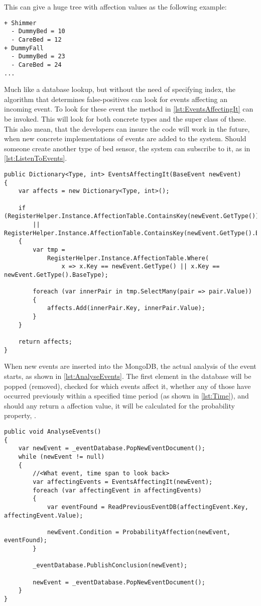 This can give a huge tree with affection values as the following example:
\vspace{-15pt}
\begin{verbatim}
+ Shimmer
  - DummyBed = 10
  - CareBed = 12
+ DummyFall
  - DummyBed = 23
  - CareBed = 24
...
\end{verbatim}
\vspace{-10pt}
Much like a database lookup, but without the need of specifying index, the algorithm that determines false-positives can look for events affecting an incoming event.
To look for these event the method in \codeTitle \ref{lst:EventsAffectingIt} can be invoked.
This will look for both concrete types and the super class of these.
This also mean, that the developers can insure the code will work in the future, when new concrete implementations of events are added to the system.
Should someone create another type of bed sensor, the system can subscribe to it, as in \codeTitle \ref{lst:ListenToEvents}.

\begin{lstlisting}[caption=Find affection based on input event, style=Code-C++, label=lst:EventsAffectingIt]
public Dictionary<Type, int> EventsAffectingIt(BaseEvent newEvent)
{
	var affects = new Dictionary<Type, int>();

	if (RegisterHelper.Instance.AffectionTable.ContainsKey(newEvent.GetType())
		|| RegisterHelper.Instance.AffectionTable.ContainsKey(newEvent.GetType().BaseType))
	{
		var tmp =
			RegisterHelper.Instance.AffectionTable.Where(
				x => x.Key == newEvent.GetType() || x.Key == newEvent.GetType().BaseType);

		foreach (var innerPair in tmp.SelectMany(pair => pair.Value))
		{
			affects.Add(innerPair.Key, innerPair.Value);
		}
	}

	return affects;
}
\end{lstlisting}

When new events are inserted into the MongoDB, the actual analysis of the event starts, as shown in \codeTitle \ref{lst:AnalyseEvents}.
The first element in the database will be popped (removed), checked for which events affect it, whether any of those have occurred previously within a specified time period (as shown in \codeTitle \ref{lst:Time}), and should any return a affection value, it will be calculated for the probability property, .

\begin{lstlisting}[caption=Analyzing an event, style=Code-C++, label=lst:AnalyseEvents]
public void AnalyseEvents()
{
	var newEvent = _eventDatabase.PopNewEventDocument();
	while (newEvent != null)
	{
		//<What event, time span to look back>
		var affectingEvents = EventsAffectingIt(newEvent);
		foreach (var affectingEvent in affectingEvents)
		{
			var eventFound = ReadPreviousEventDB(affectingEvent.Key, affectingEvent.Value);

			newEvent.Condition = ProbabilityAffection(newEvent, eventFound);
		}

		_eventDatabase.PublishConclusion(newEvent);
		
		newEvent = _eventDatabase.PopNewEventDocument();
	}
}
\end{lstlisting}

